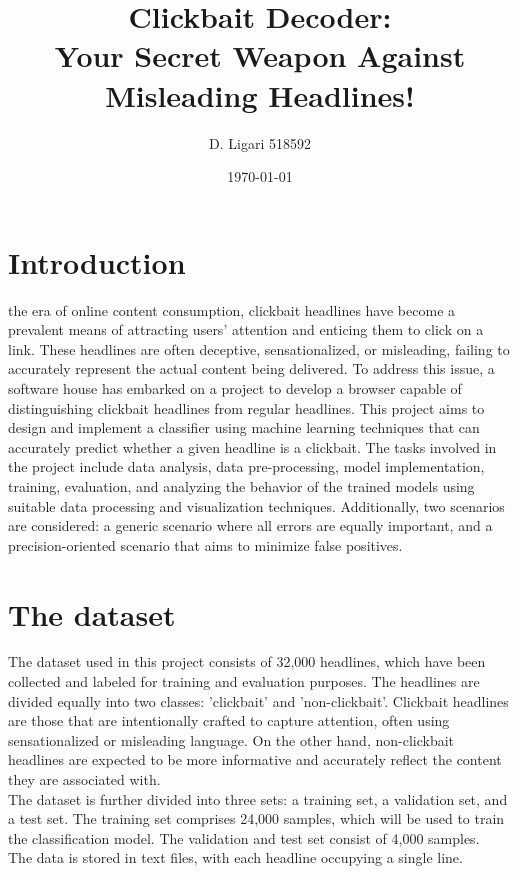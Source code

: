 \documentclass{class}
\title{Clickbait Decoder:\\Your Secret Weapon Against Misleading Headlines!}
\author[1]{D. Ligari 518592}
\affil[1]{Machine Learning course, University of Pavia, Department of Computer Engineering (Data Science), Pavia, Italy}
\date{\today}
\begin{document}
\maketitle
\thispagestyle{FirstPage}
\tableofcontents
\section{Introduction}
the era of online content consumption, clickbait headlines have become a prevalent means of attracting users' attention and enticing them to click on a link.
These headlines are often deceptive, sensationalized, or misleading, failing to accurately represent the actual content being delivered.
To address this issue, a software house has embarked on a project to develop a browser capable of distinguishing clickbait headlines from regular headlines.
This project aims to design and implement a classifier using machine learning techniques that can accurately predict whether a given headline is a clickbait.
The tasks involved in the project include data analysis, data pre-processing, model implementation, training, evaluation, and analyzing the behavior
of the trained models using suitable data processing and visualization techniques.
Additionally, two scenarios are considered: a generic scenario where all errors are equally important, and a precision-oriented scenario
that aims to minimize false positives.

\section{The dataset}
The dataset used in this project consists of 32,000 headlines, which have been collected and labeled for training and evaluation purposes.
The headlines are divided equally into two classes: 'clickbait' and 'non-clickbait'.
Clickbait headlines are those that are intentionally crafted to capture attention,
often using sensationalized or misleading language.
On the other hand, non-clickbait headlines are expected to be more informative and accurately reflect the content they are associated with.\\
The dataset is further divided into three sets: a training set, a validation set, and a test set.
The training set comprises 24,000 samples, which will be used to train the classification model. The validation and test set consist of 4,000 samples.\\
The data is stored in text files, with each headline occupying a single line.
\end{document}
